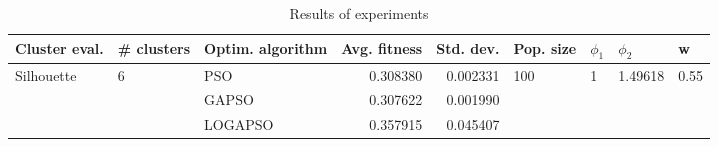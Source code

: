 \begin{table}
\centering
\caption{Results of experiments}
\begin{tabular}{lllrrllll}
\toprule
              Cluster eval. &        \# clusters & Optim. algorithm &  Avg. fitness &  Std. dev. &            Pop. size &         $\phi_{1}$ &               $\phi_{2}$ &                     w \\
\midrule
\multirow{3}{*}{Silhouette} & \multirow{3}{*}{6} &              PSO &      0.308380 &   0.002331 & \multirow{3}{*}{100} & \multirow{3}{*}{1} & \multirow{3}{*}{1.49618} & \multirow{3}{*}{0.55} \\
                            &                    &            GAPSO &      0.307622 &   0.001990 &                      &                    &                          &                       \\
                            &                    &          LOGAPSO &      0.357915 &   0.045407 &                      &                    &                          &                       \\
\bottomrule
\end{tabular}
\end{table}
